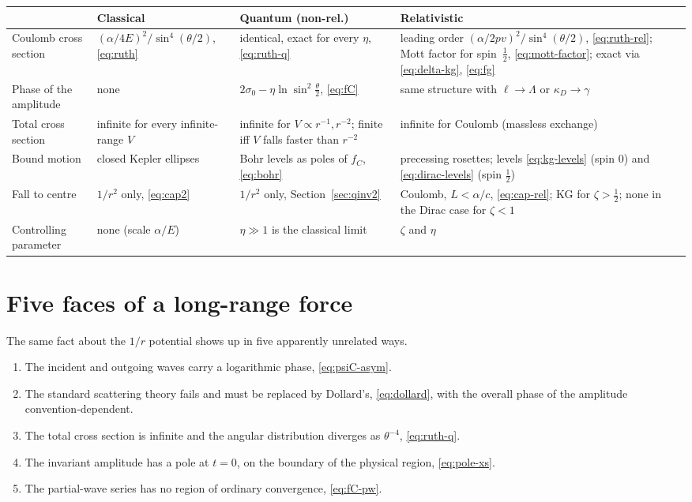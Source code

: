 \documentclass[11pt,a4paper]{book}
\numberwithin{equation}{chapter}
\begin{document}
\medskip
\noindent\small
\begin{tabular}{@{}>{\raggedright\arraybackslash}p{2.3cm}>{\raggedright\arraybackslash}p{3.5cm}>{\raggedright\arraybackslash}p{3.9cm}>{\raggedright\arraybackslash}p{4.8cm}@{}}
\hline
 & \textbf{Classical} & \textbf{Quantum (non-rel.)} & \textbf{Relativistic}\\
\hline
Coulomb cross section &
  $(\alpha/4E)^2/\sin^4(\theta/2)$, \eqref{eq:ruth} &
  identical, exact for every $\eta$, \eqref{eq:ruth-q} &
  leading order $(\alpha/2pv)^2/\sin^4(\theta/2)$, \eqref{eq:ruth-rel}; Mott factor for spin~$\tfrac12$, \eqref{eq:mott-factor}; exact via \eqref{eq:delta-kg}, \eqref{eq:fg}\\[6pt]
Phase of the amplitude &
  none &
  $2\sigma_0-\eta\ln\sin^2\tfrac\theta2$, \eqref{eq:fC} &
  same structure with $\ell\to\Lambda$ or $\kappa_D\to\gamma$\\[6pt]
Total cross section &
  infinite for every infinite-range $V$ &
  infinite for $V\propto r^{-1},r^{-2}$; finite iff $V$ falls faster than $r^{-2}$ &
  infinite for Coulomb (massless exchange)\\[6pt]
Bound motion &
  closed Kepler ellipses &
  Bohr levels as poles of $f_C$, \eqref{eq:bohr} &
  precessing rosettes; levels \eqref{eq:kg-levels} (spin 0) and \eqref{eq:dirac-levels} (spin $\tfrac12$)\\[6pt]
Fall to centre &
  $1/r^2$ only, \eqref{eq:cap2} &
  $1/r^2$ only, Section~\ref{sec:qinv2} &
  Coulomb, $L<\alpha/c$, \eqref{eq:cap-rel}; KG for $\zeta>\tfrac12$; none in the Dirac case for $\zeta<1$\\[6pt]
Controlling parameter &
  none (scale $\alpha/E$) &
  $\eta\gg1$ is the classical limit &
  $\zeta$ and $\eta$\\
\hline
\end{tabular}
\normalsize

\section{Five faces of a long-range force}

The same fact about the $1/r$ potential shows up in five apparently unrelated
ways.
\begin{enumerate}
  \item The incident and outgoing waves carry a logarithmic phase,
        \eqref{eq:psiC-asym}.
  \item The standard scattering theory fails and must be replaced by Dollard's,
        \eqref{eq:dollard}, with the overall phase of the amplitude
        convention-dependent.
  \item The total cross section is infinite and the angular distribution
        diverges as $\theta^{-4}$, \eqref{eq:ruth-q}.
  \item The invariant amplitude has a pole at $t=0$, on the boundary of the
        physical region, \eqref{eq:pole-xs}.
  \item The partial-wave series has no region of ordinary convergence,
        \eqref{eq:fC-pw}.
\end{enumerate}
\end{document}
